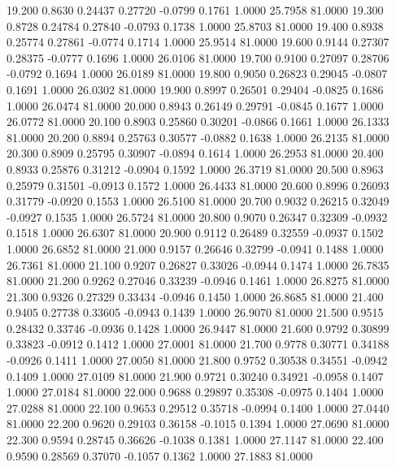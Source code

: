   19.200   0.8630   0.24437   0.27720  -0.0799   0.1761   1.0000  25.7958  81.0000
  19.300   0.8728   0.24784   0.27840  -0.0793   0.1738   1.0000  25.8703  81.0000
  19.400   0.8938   0.25774   0.27861  -0.0774   0.1714   1.0000  25.9514  81.0000
  19.600   0.9144   0.27307   0.28375  -0.0777   0.1696   1.0000  26.0106  81.0000
  19.700   0.9100   0.27097   0.28706  -0.0792   0.1694   1.0000  26.0189  81.0000
  19.800   0.9050   0.26823   0.29045  -0.0807   0.1691   1.0000  26.0302  81.0000
  19.900   0.8997   0.26501   0.29404  -0.0825   0.1686   1.0000  26.0474  81.0000
  20.000   0.8943   0.26149   0.29791  -0.0845   0.1677   1.0000  26.0772  81.0000
  20.100   0.8903   0.25860   0.30201  -0.0866   0.1661   1.0000  26.1333  81.0000
  20.200   0.8894   0.25763   0.30577  -0.0882   0.1638   1.0000  26.2135  81.0000
  20.300   0.8909   0.25795   0.30907  -0.0894   0.1614   1.0000  26.2953  81.0000
  20.400   0.8933   0.25876   0.31212  -0.0904   0.1592   1.0000  26.3719  81.0000
  20.500   0.8963   0.25979   0.31501  -0.0913   0.1572   1.0000  26.4433  81.0000
  20.600   0.8996   0.26093   0.31779  -0.0920   0.1553   1.0000  26.5100  81.0000
  20.700   0.9032   0.26215   0.32049  -0.0927   0.1535   1.0000  26.5724  81.0000
  20.800   0.9070   0.26347   0.32309  -0.0932   0.1518   1.0000  26.6307  81.0000
  20.900   0.9112   0.26489   0.32559  -0.0937   0.1502   1.0000  26.6852  81.0000
  21.000   0.9157   0.26646   0.32799  -0.0941   0.1488   1.0000  26.7361  81.0000
  21.100   0.9207   0.26827   0.33026  -0.0944   0.1474   1.0000  26.7835  81.0000
  21.200   0.9262   0.27046   0.33239  -0.0946   0.1461   1.0000  26.8275  81.0000
  21.300   0.9326   0.27329   0.33434  -0.0946   0.1450   1.0000  26.8685  81.0000
  21.400   0.9405   0.27738   0.33605  -0.0943   0.1439   1.0000  26.9070  81.0000
  21.500   0.9515   0.28432   0.33746  -0.0936   0.1428   1.0000  26.9447  81.0000
  21.600   0.9792   0.30899   0.33823  -0.0912   0.1412   1.0000  27.0001  81.0000
  21.700   0.9778   0.30771   0.34188  -0.0926   0.1411   1.0000  27.0050  81.0000
  21.800   0.9752   0.30538   0.34551  -0.0942   0.1409   1.0000  27.0109  81.0000
  21.900   0.9721   0.30240   0.34921  -0.0958   0.1407   1.0000  27.0184  81.0000
  22.000   0.9688   0.29897   0.35308  -0.0975   0.1404   1.0000  27.0288  81.0000
  22.100   0.9653   0.29512   0.35718  -0.0994   0.1400   1.0000  27.0440  81.0000
  22.200   0.9620   0.29103   0.36158  -0.1015   0.1394   1.0000  27.0690  81.0000
  22.300   0.9594   0.28745   0.36626  -0.1038   0.1381   1.0000  27.1147  81.0000
  22.400   0.9590   0.28569   0.37070  -0.1057   0.1362   1.0000  27.1883  81.0000
